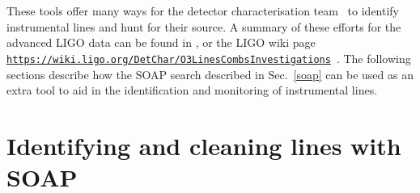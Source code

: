 These tools offer many ways for the detector characterisation team~ to identify
instrumental lines and hunt for their source. A summary of these efforts for
the advanced \gls{LIGO} data can be found in
\citep{covas2018IdentificationMitigation}, or the \gls{LIGO} wiki page {\tt
\url{https://wiki.ligo.org/DetChar/O3LinesCombsInvestigations}}~. The following
sections describe how the SOAP search described in Sec.~\ref{soap} can be used
as an extra tool to aid in the identification and monitoring of instrumental
lines.

\clearpage

\section{\label{detchar:soap}Identifying and cleaning lines with SOAP}

